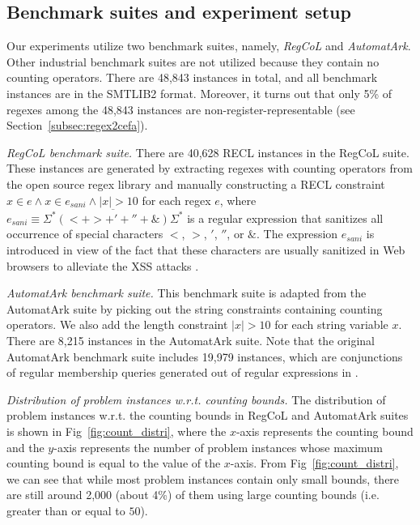 \subsection{Benchmark suites and experiment setup}\label{sec:bench}

Our experiments utilize two benchmark suites, namely, \emph{RegCoL} and \emph{AutomatArk}. Other industrial benchmark suites are not utilized because they contain no counting operators. There are 48,843 instances in total, and all benchmark instances are in the SMTLIB2 format.
Moreover, it turns out that only 5\% of regexes among the 48,843 instances are non-register-representable (see Section~\ref{subsec:regex2cefa}).

\medskip
\noindent
\emph{RegCoL benchmark suite.} There are 40,628 RECL instances in the RegCoL suite. These instances are generated by extracting regexes with counting operators from the open source regex library \cite{regex_lingua_franca,redos_lenka} and manually constructing a RECL constraint $x \in e \wedge x \in e_{sani} \wedge |x| > 10$ for each regex $e$,
where $e_{sani} \equiv \overline{\Sigma^*(<+ >+'+''+\&)\Sigma^*}$ is a regular expression that sanitizes all occurrence of special characters $<$, $>$, $'$, $''$, or $\&$. 
The expression $e_{sani}$ is introduced in view of the fact that these characters are usually sanitized in Web browsers to alleviate the XSS attacks \cite{malware_detection_3_kudzu,CCH_18}.

\medskip
\noindent
\emph{AutomatArk benchmark suite.}
This benchmark suite is adapted from the AutomatArk suite \cite{z3str3re} by picking out the string constraints containing counting operators. We also add the length constraint $|x| > 10$ for each string variable $x$. There are 8,215 instances in the AutomatArk suite.
Note that the original AutomatArk benchmark suite \cite{z3str3re} includes 19,979 instances, which are conjunctions of regular membership queries generated out of regular expressions in \cite{automatark}.

\medskip
\noindent
\emph{Distribution of problem instances w.r.t. counting bounds. }
The distribution of problem instances w.r.t. the counting bounds in RegCoL and AutomatArk suites is shown in Fig~\ref{fig:count_distri}, where the $x$-axis represents the counting bound and the $y$-axis represents the number of problem instances whose maximum counting bound is equal to the value of the $x$-axis. 
From Fig~\ref{fig:count_distri}, we can see that while most problem instances contain only small bounds, there are still around 2,000  (about 4\%) of them using large counting bounds (i.e. greater than or equal to $50$).

